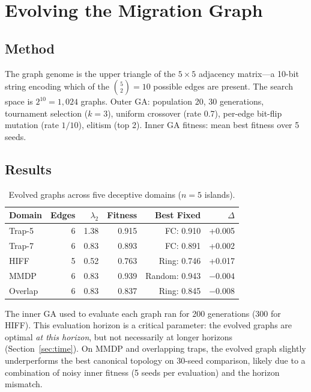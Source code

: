 \documentclass[sigconf,nonacm]{acmart}
\begin{document}
\section{Evolving the Migration Graph}
\label{sec:evolving}

\subsection{Method}


The graph genome is the upper triangle of the $5 \times 5$ adjacency
matrix---a 10-bit string encoding which of the
$\binom{5}{2} = 10$ possible edges are present. The search space is
$2^{10} = 1{,}024$ graphs. Outer GA: population 20, 30 generations,
tournament selection ($k=3$), uniform crossover (rate 0.7), per-edge
bit-flip mutation (rate $1/10$), elitism (top 2). Inner GA fitness:
mean best fitness over 5 seeds.

\subsection{Results}

\begin{table}[h]
\caption{Evolved graphs across five deceptive domains ($n = 5$ islands).}
\label{tab:evolved}
\centering
\begin{tabular}{lrrrrr}
\toprule
\textbf{Domain} & \textbf{Edges} & $\lambda_2$ & \textbf{Fitness} & \textbf{Best Fixed} & $\Delta$ \\
\midrule
Trap-5   & 6 & 1.38 & 0.915 & FC: 0.910     & +0.005 \\
Trap-7   & 6 & 0.83 & 0.893 & FC: 0.891     & +0.002 \\
HIFF     & 5 & 0.52 & 0.763 & Ring: 0.746   & +0.017 \\
MMDP     & 6 & 0.83 & 0.939 & Random: 0.943 & $-0.004$ \\
Overlap  & 6 & 0.83 & 0.837 & Ring: 0.845   & $-0.008$ \\
\bottomrule
\end{tabular}
\end{table}

The inner GA used to evaluate each graph ran for 200 generations (300
for HIFF). This evaluation horizon is a critical parameter: the
evolved graphs are optimal \emph{at this horizon}, but not necessarily
at longer horizons (Section~\ref{sec:time}). On MMDP and overlapping
traps, the evolved graph slightly underperforms the best canonical
topology on 30-seed comparison, likely due to a combination of noisy
inner fitness (5 seeds per evaluation) and the horizon mismatch.
\end{document}
